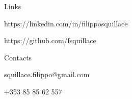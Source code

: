 \begin{cvlist}{Links}
  \item[\textbullet] \footnotesize{https://linkedin.com/in/filipposquillace}
  \item[\textbullet] \footnotesize{https://github.com/fsquillace}
\end{cvlist}
\begin{cvlist}{Contacts\footnotemark[2]}
  \item[\ding{41}] squillace.filippo@gmail.com
  \item[\ding{37}] +353 85 85 62 557
\end{cvlist}